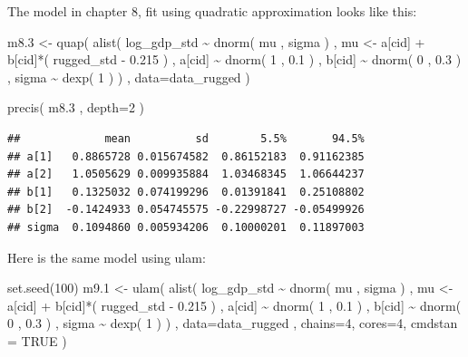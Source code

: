 \documentclass[
]{book}
\newenvironment{Shaded}{\begin{snugshade}}{\end{snugshade}}
\newcommand{\AttributeTok}[1]{\textcolor[rgb]{0.77,0.63,0.00}{#1}}
\newcommand{\ConstantTok}[1]{\textcolor[rgb]{0.00,0.00,0.00}{#1}}
\newcommand{\DecValTok}[1]{\textcolor[rgb]{0.00,0.00,0.81}{#1}}
\newcommand{\FloatTok}[1]{\textcolor[rgb]{0.00,0.00,0.81}{#1}}
\newcommand{\FunctionTok}[1]{\textcolor[rgb]{0.00,0.00,0.00}{#1}}
\newcommand{\NormalTok}[1]{#1}
\newcommand{\OtherTok}[1]{\textcolor[rgb]{0.56,0.35,0.01}{#1}}
\newcommand{\SpecialCharTok}[1]{\textcolor[rgb]{0.00,0.00,0.00}{#1}}
\begin{document}
The model in chapter 8, fit using quadratic approximation looks like this:

\begin{Shaded}
\begin{Highlighting}[]
\NormalTok{m8}\FloatTok{.3} \OtherTok{\textless{}{-}} \FunctionTok{quap}\NormalTok{( }\FunctionTok{alist}\NormalTok{(}
\NormalTok{log\_gdp\_std }\SpecialCharTok{\textasciitilde{}} \FunctionTok{dnorm}\NormalTok{( mu , sigma ) , }
\NormalTok{mu }\OtherTok{\textless{}{-}}\NormalTok{ a[cid] }\SpecialCharTok{+}\NormalTok{ b[cid]}\SpecialCharTok{*}\NormalTok{( rugged\_std }\SpecialCharTok{{-}} \FloatTok{0.215}\NormalTok{ ) , }
\NormalTok{a[cid] }\SpecialCharTok{\textasciitilde{}} \FunctionTok{dnorm}\NormalTok{( }\DecValTok{1}\NormalTok{ , }\FloatTok{0.1}\NormalTok{ ) , }
\NormalTok{b[cid] }\SpecialCharTok{\textasciitilde{}} \FunctionTok{dnorm}\NormalTok{( }\DecValTok{0}\NormalTok{ , }\FloatTok{0.3}\NormalTok{ ) , }
\NormalTok{sigma }\SpecialCharTok{\textasciitilde{}} \FunctionTok{dexp}\NormalTok{( }\DecValTok{1}\NormalTok{ )}
\NormalTok{) , }\AttributeTok{data=}\NormalTok{data\_rugged )}

\FunctionTok{precis}\NormalTok{( m8}\FloatTok{.3}\NormalTok{ , }\AttributeTok{depth=}\DecValTok{2}\NormalTok{ )}
\end{Highlighting}
\end{Shaded}

\begin{verbatim}
##             mean          sd        5.5%       94.5%
## a[1]   0.8865728 0.015674582  0.86152183  0.91162385
## a[2]   1.0505629 0.009935884  1.03468345  1.06644237
## b[1]   0.1325032 0.074199296  0.01391841  0.25108802
## b[2]  -0.1424933 0.054745575 -0.22998727 -0.05499926
## sigma  0.1094860 0.005934206  0.10000201  0.11897003
\end{verbatim}

Here is the same model using ulam:

\begin{Shaded}
\begin{Highlighting}[]
\FunctionTok{set.seed}\NormalTok{(}\DecValTok{100}\NormalTok{)}
\NormalTok{m9}\FloatTok{.1} \OtherTok{\textless{}{-}} \FunctionTok{ulam}\NormalTok{( }\FunctionTok{alist}\NormalTok{(}
\NormalTok{log\_gdp\_std }\SpecialCharTok{\textasciitilde{}} \FunctionTok{dnorm}\NormalTok{( mu , sigma ) ,}
\NormalTok{mu }\OtherTok{\textless{}{-}}\NormalTok{ a[cid] }\SpecialCharTok{+}\NormalTok{ b[cid]}\SpecialCharTok{*}\NormalTok{( rugged\_std }\SpecialCharTok{{-}} \FloatTok{0.215}\NormalTok{ ) ,}
\NormalTok{a[cid] }\SpecialCharTok{\textasciitilde{}} \FunctionTok{dnorm}\NormalTok{( }\DecValTok{1}\NormalTok{ , }\FloatTok{0.1}\NormalTok{ ) ,}
\NormalTok{b[cid] }\SpecialCharTok{\textasciitilde{}} \FunctionTok{dnorm}\NormalTok{( }\DecValTok{0}\NormalTok{ , }\FloatTok{0.3}\NormalTok{ ) ,}
\NormalTok{sigma }\SpecialCharTok{\textasciitilde{}} \FunctionTok{dexp}\NormalTok{( }\DecValTok{1}\NormalTok{ )}
\NormalTok{) , }\AttributeTok{data=}\NormalTok{data\_rugged , }\AttributeTok{chains=}\DecValTok{4}\NormalTok{, }\AttributeTok{cores=}\DecValTok{4}\NormalTok{, }\AttributeTok{cmdstan =} \ConstantTok{TRUE}\NormalTok{ )}
\end{Highlighting}
\end{Shaded}
\end{document}
